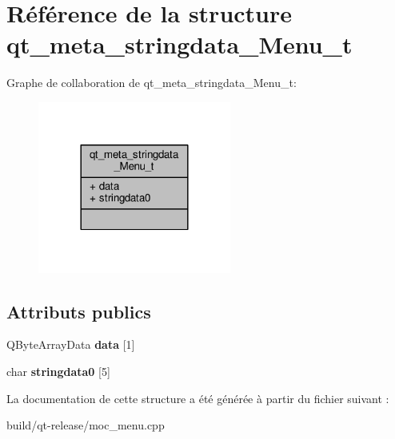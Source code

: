 \hypertarget{structqt__meta__stringdata__Menu__t}{}\section{Référence de la structure qt\+\_\+meta\+\_\+stringdata\+\_\+\+Menu\+\_\+t}
\label{structqt__meta__stringdata__Menu__t}


Graphe de collaboration de qt\+\_\+meta\+\_\+stringdata\+\_\+\+Menu\+\_\+t\+:
\nopagebreak
\begin{figure}[H]
\begin{center}
\leavevmode
\includegraphics[width=180pt]{structqt__meta__stringdata__Menu__t__coll__graph}
\end{center}
\end{figure}
\subsection*{Attributs publics}
\begin{DoxyCompactItemize}
\item 
Q\+Byte\+Array\+Data {\bfseries data} \mbox{[}1\mbox{]}\hypertarget{structqt__meta__stringdata__Menu__t_a32af568e87291fc0cc6d146ca7c26089}{}\label{structqt__meta__stringdata__Menu__t_a32af568e87291fc0cc6d146ca7c26089}

\item 
char {\bfseries stringdata0} \mbox{[}5\mbox{]}\hypertarget{structqt__meta__stringdata__Menu__t_a088169a5b0977c18edfef3f9fba60ca6}{}\label{structqt__meta__stringdata__Menu__t_a088169a5b0977c18edfef3f9fba60ca6}

\end{DoxyCompactItemize}


La documentation de cette structure a été générée à partir du fichier suivant \+:\begin{DoxyCompactItemize}
\item 
build/qt-\/release/moc\+\_\+menu.\+cpp\end{DoxyCompactItemize}
